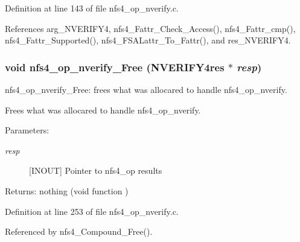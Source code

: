 Definition at line 143 of file nfs4\_\-op\_\-nverify.c.

References arg\_\-NVERIFY4, nfs4\_\-Fattr\_\-Check\_\-Access(), nfs4\_\-Fattr\_\-cmp(), nfs4\_\-Fattr\_\-Supported(), nfs4\_\-FSALattr\_\-To\_\-Fattr(), and res\_\-NVERIFY4.
\subsubsection{\setlength{\rightskip}{0pt plus 5cm}void nfs4\_\-op\_\-nverify\_\-Free (NVERIFY4res $\ast$ {\em resp})}\label{nfs4__op__nverify_8c_a3}


nfs4\_\-op\_\-nverify\_\-Free: frees what was allocared to handle nfs4\_\-op\_\-nverify.

Frees what was allocared to handle nfs4\_\-op\_\-nverify.

\begin{Desc}
\item[Parameters:]
\begin{description}
\item[{\em resp}][INOUT] Pointer to nfs4\_\-op results\end{description}
\end{Desc}
\begin{Desc}
\item[Returns:]nothing (void function ) \end{Desc}


Definition at line 253 of file nfs4\_\-op\_\-nverify.c.

Referenced by nfs4\_\-Compound\_\-Free().